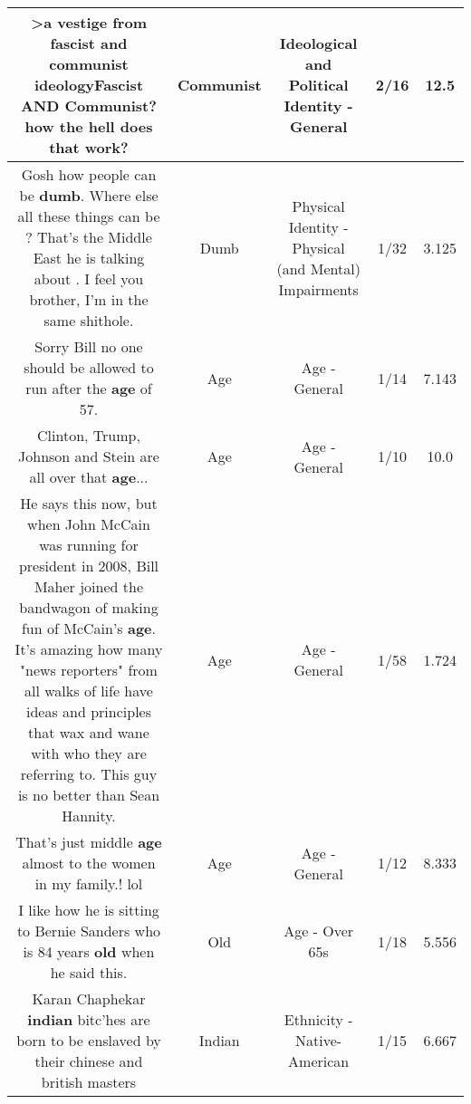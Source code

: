 \documentclass[11pt]{article}
\newlength\mylength
\begin{document}
\begin{center}
\begin{longtable}{|C{.65\mylength}|C{.30\mylength}|C{.12\mylength}|C{.12\mylength}|C{.12\mylength}|}
  \small >a vestige from fascist and \textbf{communist} ideologyFascist AND \textbf{Communist}? how the hell does that work?\normalsize   & Communist &  Ideological and Political Identity - General & 2/16 & 12.5 \\  \hline
  \small Gosh how people can be \textbf{dumb}. Where else all these things can be ? That's the Middle East he is talking about . I feel you brother, I'm in the same shithole.\normalsize   & Dumb & Physical Identity - Physical (and Mental) Impairments & 1/32 & 3.125 \\  \hline
  \small Sorry Bill no one should be allowed to run after the \textbf{age} of 57.\normalsize   & Age & Age - General & 1/14 & 7.143 \\  \hline
  \small Clinton, Trump, Johnson and Stein are all over that \textbf{age}...\normalsize   & Age & Age - General & 1/10 & 10.0 \\  \hline
  \small He says this now, but when John McCain was running for president in 2008, Bill Maher joined the bandwagon of making fun of McCain's \textbf{age}.  It's amazing how many "news reporters" from all walks of life have ideas and principles that wax and wane with who they are referring to.  This guy is no better than Sean Hannity.\normalsize   & Age & Age - General & 1/58 & 1.724 \\  \hline
  \small That's just middle \textbf{age} almost to the women in my family.!   lol\normalsize   & Age & Age - General & 1/12 & 8.333 \\  \hline
  \small I like how he is sitting to Bernie Sanders who is 84 years \textbf{old} when he said this.\normalsize   & Old & Age - Over 65s & 1/18 & 5.556 \\  \hline
  \small Karan Chaphekar \textbf{indian} bitc'hes are born to be enslaved by their chinese and british masters\normalsize   & Indian & Ethnicity - Native-American & 1/15 & 6.667 \\  \hline

\end{longtable}
\end{center}
\end{document}
